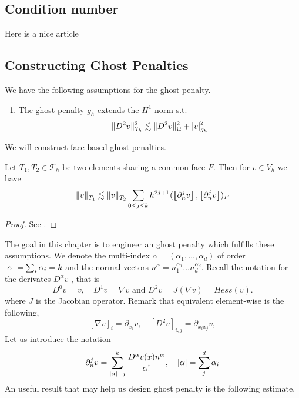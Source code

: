 



\newpage
\subsection{Condition number}%
\label{sec:condition_number}

Here is a nice article \cite{li07}

\newpage
\subsection{Constructing Ghost Penalties}%
\label{sec:constructing_ghost_penalties}

We have the following assumptions for the ghost penalty.
\begin{enumerate}[label=\textbf{EP\arabic*}]
    \item\label{as:EP1} The ghost penalty $g_{h}$ extends the $H^{1}$ norm s.t. \[
    \| D^2v \|_{ \mathcal{T} _{h} }^{ 2 }  \lesssim \| D^2 v \|_{ \Omega  }^{  2} + \left\lvert  v  \right\rvert _{g_{h}}^2
    \]
\end{enumerate}


We will construct face-based ghost penalties.

\begin{lemma}
    Let $T_{1},T_{2 } \in  \mathcal{T} _{h}$ be two elements sharing a common face $F$. Then for $v \in V_{h}$  we have \[
    \| v \|_{ T_{1} }^{  }  \lesssim \| v \|_{ T_{2} }^{  } \sum_{0\le j\le k}  {h^{2j +1}}^{} ( \jump{ \partial _{n}^{j} v }, \jump{ \partial ^{j}_{n} v }    )_{F}
    \]

\end{lemma}
\begin{proof}
    See \cite[Lemma 2.19]{gurkan2019stabilized}.
\end{proof}
The goal in this chapter is to engineer an ghost penalty which fulfills these assumptions.
We denote the multi-index $\alpha  = ( \alpha _{1}, \ldots, \alpha _{d})  $ of order $\left\lvert  \alpha   \right\rvert = \sum_{i}^{}  \alpha _{i} = k $   and the normal vectors $n^{\alpha } = n_{1}^{\alpha _{1}} \ldots n_{d}^{\alpha _{d}}$.
Recall the notation for the derivates $D^{\alpha } v$ , that is \[
D ^{0} v  = v, \quad   D ^{1}v  = \nabla v \text{ and }  D ^{2} v  = J(\nabla v) = Hess(v).
\]
where $J$ is the Jacobian operator. Remark that equivalent element-wise is the following, \[
\left[ \nabla v \right] _{i} = \partial_{x_{i}} v, \quad  \left[ D^2 v \right] _{i,j} = \partial_{x_{i}x_{j}} v,
\]
Let us introduce the notation \[
\partial _{n}^{j} v = \sum_{\left\lvert  \alpha   \right\rvert =j }^{k} \frac{D ^{\alpha }v( x) n^{\alpha }}{\alpha !}, \quad \left\lvert  \alpha   \right\rvert = \sum_{j}^{d} \alpha_{i}
\]
An useful result that may help us design ghost penalty is the following estimate.

